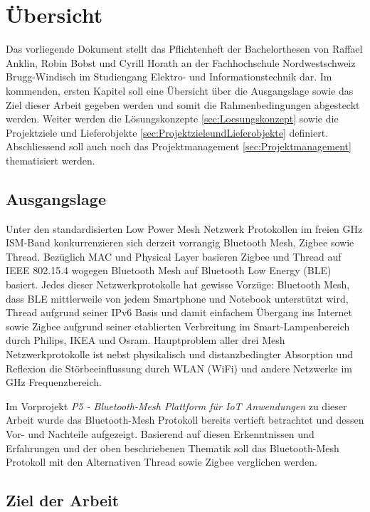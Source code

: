 	\clearpage
\section{Übersicht}\label{sec:Uebersicht}

Das vorliegende Dokument stellt das Pflichtenheft der Bachelorthesen von Raffael Anklin, Robin Bobst und Cyrill Horath an der Fachhochschule Nordwestschweiz Brugg-Windisch im Studiengang Elektro- und Informationstechnik dar. 
Im kommenden, ersten Kapitel soll eine Übersicht über die Ausgangslage sowie das Ziel dieser Arbeit gegeben werden und somit die Rahmenbedingungen abgesteckt werden. Weiter werden die Lösungskonzepte \ref{sec:Loesungskonzept} sowie die Projektziele und Lieferobjekte \ref{sec:ProjektzieleundLieferobjekte} definiert. Abschliessend soll auch noch das Projektmanagement \ref{sec:Projektmanagement} thematisiert werden. 

\subsection{Ausgangslage}\label{subsec:Ausgangslage}

Unter den standardisierten Low Power Mesh Netzwerk Protokollen im
freien GHz ISM-Band konkurrenzieren sich derzeit vorrangig Bluetooth Mesh, Zigbee sowie Thread.
Bezüglich MAC und Physical Layer basieren Zigbee und Thread auf IEEE 802.15.4 wogegen Bluetooth Mesh auf Bluetooth Low Energy (BLE)
basiert.
Jedes dieser Netzwerkprotokolle hat gewisse Vorzüge: Bluetooth Mesh, dass BLE mittlerweile von jedem Smartphone und Notebook unterstützt wird, Thread aufgrund seiner IPv6 Basis und damit einfachem Übergang ins Internet sowie Zigbee aufgrund seiner etablierten Verbreitung im Smart-Lampenbereich durch Philips, IKEA und Osram.
Hauptproblem aller drei Mesh Netzwerkprotokolle ist nebst physikalisch und distanzbedingter Absorption und Reflexion die Störbeeinflussung durch WLAN (WiFi) und andere Netzwerke im GHz Frequenzbereich.

Im Vorprojekt \textit{P5 - Bluetooth-Mesh Plattform für IoT Anwendungen} zu dieser Arbeit wurde das Bluetooth-Mesh Protokoll bereits vertieft betrachtet und dessen Vor- und Nachteile aufgezeigt. Basierend auf diesen Erkenntnissen und Erfahrungen und der oben beschriebenen Thematik soll das Bluetooth-Mesh Protokoll mit den Alternativen Thread sowie Zigbee verglichen werden.

\subsection{Ziel der Arbeit}\label{subsec:ZielderArbeit}

